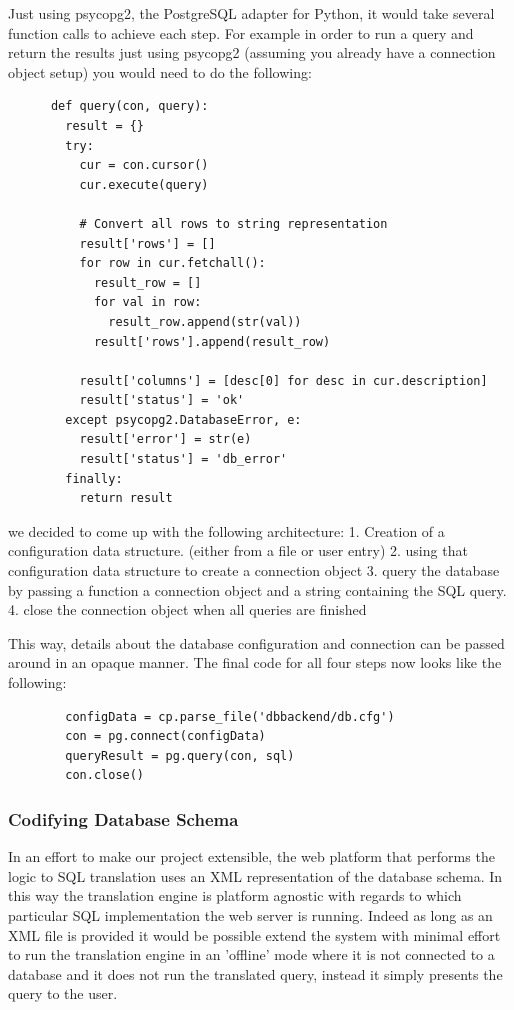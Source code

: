 \documentclass[a4paper, 11pt]{article}
\begin{document}
      Just using psycopg2, the PostgreSQL adapter for Python, it would take
      several function calls to achieve each step. For example in order to run a
      query and return the results just using psycopg2 (assuming you already
      have a connection object setup) you would need to do the following:

      \begin{verbatim}
      def query(con, query):
        result = {}
        try:
          cur = con.cursor()
          cur.execute(query)

          # Convert all rows to string representation
          result['rows'] = []
          for row in cur.fetchall():
            result_row = []
            for val in row:
              result_row.append(str(val))
            result['rows'].append(result_row)

          result['columns'] = [desc[0] for desc in cur.description]
          result['status'] = 'ok'
        except psycopg2.DatabaseError, e:
          result['error'] = str(e)
          result['status'] = 'db_error'
        finally:
          return result
      \end{verbatim}

      we decided to come up with the following architecture: 
      1. Creation of a configuration data structure. (either from a file or user
         entry)
      2. using that configuration data structure to create a connection object
      3. query the database by passing a function a connection object and a
      string containing the SQL query.
      4. close the connection object when all queries are finished

      This way, details about the database configuration and connection 
      can be passed around in an opaque manner. The final code for all four
      steps now looks like the following: 

      \begin{verbatim}
        configData = cp.parse_file('dbbackend/db.cfg')
        con = pg.connect(configData)
        queryResult = pg.query(con, sql)
        con.close()
      \end{verbatim}

    \subsubsection{Codifying Database Schema}
      In an effort to make our project extensible, the web platform that performs 
      the logic to SQL translation uses an XML representation of the database
      schema. In this way the translation engine is platform agnostic with
      regards to which particular SQL implementation the web server is running.
      Indeed as long as an XML file is provided it would be possible extend the
      system with minimal effort to run the translation engine in an 'offline' mode 
      where it is not connected to a database and it does not run the translated 
      query, instead it simply presents the query to the user.
\end{document}
